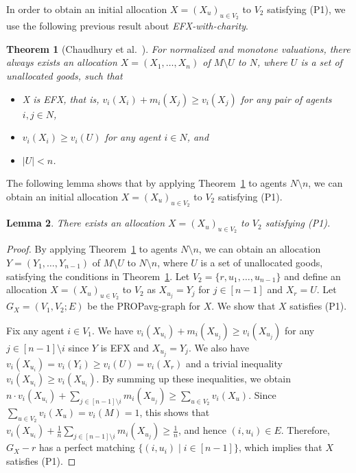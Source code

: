 \documentclass[11pt]{article}
\newtheorem{theorem}{Theorem}
\newtheorem{lemma}[theorem]{Lemma}
\newcommand{\PROPavg}{\textsf{PROPavg}\xspace}
\newcommand{\EFX}{\textsf{EFX}\xspace}
\begin{document}
In order to obtain an initial allocation ${X}=(X_u)_{u \in V_2}$ to $V_2$ satisfying (P1), we use the following previous result about {\it \EFX-with-charity}.
\label{sec: propavg}
\begin{theorem} [Chaudhury et al.~\cite{chaudhury2021little}]\label{thm: charity}
For normalized and monotone valuations, there always exists an allocation $X=(X_1,\ldots, X_n)$ of $M \setminus U$ to $N$, where $U$ is a set of unallocated goods, such that 
\begin{itemize}
\item X is \EFX, that is, $v_i(X_i)+m_i(X_j) \ge v_i(X_j)$ for any pair of agents $i,j \in N$, 
\item $v_i(X_i) \ge v_i(U)$ for any agent $i \in N$, and 
\item $|U| < n$.
\end{itemize}
\end{theorem}
The following lemma shows that by applying Theorem~\ref{thm: charity} to agents $N \setminus n$, we can obtain an initial allocation ${X}=(X_u)_{u \in V_2}$ to $V_2$ satisfying (P1).
\begin{lemma}\label{lem: initial}
There exists an allocation ${X}=(X_u)_{u \in V_2}$ to $V_2$ satisfying (P1).
\end{lemma}
\begin{proof}
By applying Theorem~\ref{thm: charity} to agents  $N \setminus n$, we can obtain an allocation $Y =(Y_1,\ldots, Y_{n-1})$ of $M \setminus U$ to $N \setminus n$, where $U$ is a set of unallocated goods, 
satisfying the conditions in Theorem~\ref{thm: charity}.
Let $V_2 = \{r, u_1, \dots , u_{n-1}\}$ and 
define  an allocation $X =(X_u)_{u \in V_2}$ to $V_2$ as $X_{u_j} =Y_j$ for $j \in [n-1]$ and $X_r = U$. 
Let $G_X=(V_1, V_2; E)$ be the \PROPavg-graph for $X$.
We show that $X$ satisfies (P1).  


Fix any agent $i \in V_1$.
We have $v_i(X_{u_i})+m_i(X_{u_j}) \ge v_i(X_{u_j})$ for any $j\in [n-1]\setminus i$ since $Y$ is \EFX and $X_{u_j} =Y_j$.
We also have $v_i(X_{u_i}) = v_i(Y_i) \ge v_i(U) = v_i(X_r)$ and a trivial inequality $v_i(X_{u_i}) \ge v _i(X_{u_i})$.
By summing up these inequalities, we obtain $n \cdot v_i(X_{u_i}) + \sum_{j\in [n-1]\setminus i} m_i(X_{u_j}) \ge \sum_{u \in V_2} v_i (X_u)$. 
Since $\sum_{u \in V_2} v_i (X_u) = v_i (M) = 1$,  this shows that $v_i(X_{u_i})+\frac{1}{n}\sum_{j\in [n-1]\setminus i} m_i(X_{u_j}) \ge \frac{1}{n}$, and hence $(i, u_i)\in E$.
Therefore,  $G_{X} - r$ has a perfect matching $\{ (i, u_i) \mid i \in [n-1]\}$, which implies that $X$ satisfies (P1). 
\end{proof}
\end{document}
